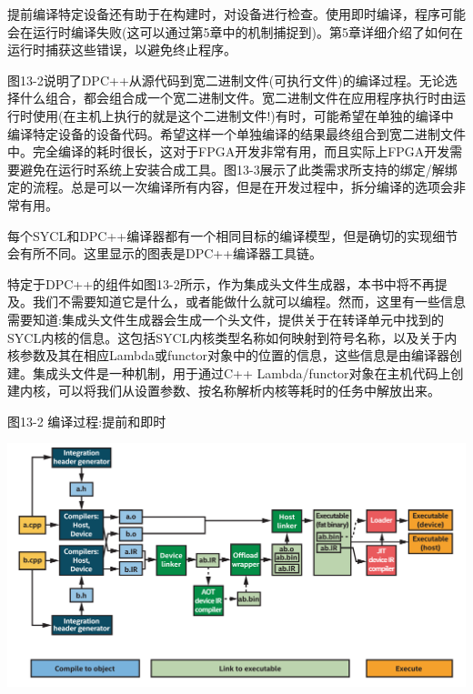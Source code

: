 提前编译特定设备还有助于在构建时，对设备进行检查。使用即时编译，程序可能会在运行时编译失败(这可以通过第5章中的机制捕捉到)。第5章详细介绍了如何在运行时捕获这些错误，以避免终止程序。\par

图13-2说明了DPC++从源代码到宽二进制文件(可执行文件)的编译过程。无论选择什么组合，都会组合成一个宽二进制文件。宽二进制文件在应用程序执行时由运行时使用(在主机上执行的就是这个二进制文件!)有时，可能希望在单独的编译中编译特定设备的设备代码。希望这样一个单独编译的结果最终组合到宽二进制文件中。完全编译的耗时很长，这对于FPGA开发非常有用，而且实际上FPGA开发需要避免在运行时系统上安装合成工具。图13-3展示了此类需求所支持的绑定/解绑定的流程。总是可以一次编译所有内容，但是在开发过程中，拆分编译的选项会非常有用。\par

每个SYCL和DPC++编译器都有一个相同目标的编译模型，但是确切的实现细节会有所不同。这里显示的图表是DPC++编译器工具链。\par

特定于DPC++的组件如图13-2所示，作为集成头文件生成器，本书中将不再提及。我们不需要知道它是什么，或者能做什么就可以编程。然而，这里有一些信息需要知道:集成头文件生成器会生成一个头文件，提供关于在转译单元中找到的SYCL内核的信息。这包括SYCL内核类型名称如何映射到符号名称，以及关于内核参数及其在相应Lambda或functor对象中的位置的信息，这些信息是由编译器创建。集成头文件是一种机制，用于通过C++ Lambda/functor对象在主机代码上创建内核，可以将我们从设置参数、按名称解析内核等耗时的任务中解放出来。\par

\hspace*{\fill} \par %
图13-2 编译过程:提前和即时
\begin{center}
	\includegraphics[width=1.\textwidth]{content/chapter-13/images/3}
\end{center}

